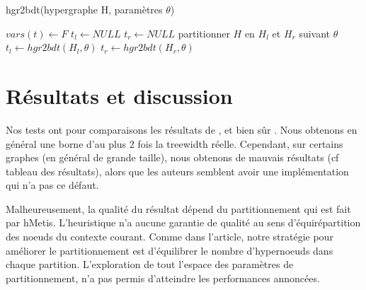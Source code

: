 \documentclass{article}
\begin{document}
\vspace{1cm}

\begin{algorithm}
  \caption{hgr2bdt(hypergraphe H, paramètres $\theta$)}
  \begin{algorithmic}
        \STATE $vars(t) \gets F$
        \STATE $t_l \gets NULL$
        \STATE $t_r \gets NULL$
    \ELSE
        \STATE partitionner $H$ en $H_l$ et $H_r$ suivant $\theta$
        \STATE $t_l \gets hgr2bdt(H_l, \theta)$
        \STATE $t_r \gets hgr2bdt(H_r, \theta)$
    \ENDIF
  \end{algorithmic}
  \label{algo2}
\end{algorithm}


\newpage
\section{Résultats et discussion}
Nos tests ont pour comparaisons les résultats de \cite{tree},
\cite{ref} et bien sûr \cite{rootpaper}. Nous obtenons en général une
borne d'au plus 2 fois la treewidth réelle. Cependant, sur certains
graphes (en général de grande taille), nous obtenons de mauvais
résultats (cf tableau des résultats), alors que les auteurs semblent
avoir une implémentation qui n'a pas ce défaut.

Malheureusement, la qualité du résultat dépend du partitionnement qui
est fait par hMetis.  L'heuristique n'a aucune garantie de qualité au
sens d'équirépartition des noeuds du contexte courant.  Comme dans
l'article, notre stratégie pour améliorer le partitionnement est
d'équilibrer le nombre d'hypernoeuds dans chaque partition.
L'exploration de tout l'espace des paramètres de partitionnement, n'a
pas permis d'atteindre les performances annoncées.

\vspace{1.5cm}
\end{document}
